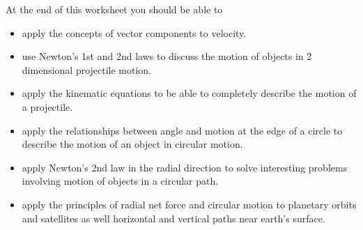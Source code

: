 At the end of this worksheet you should be able to  
\begin{itemize}
	\item apply the concepts of vector components to velocity.
	\item use Newton's 1st and 2nd laws to discuss the motion of objects in 2 dimensional projectile motion.
	\item apply the kinematic equations to be able to completely describe the motion of a projectile.
	\item apply the relationships between angle and motion at the edge of a circle to describe the motion of an object in circular motion.
	\item apply Newton's 2nd law in the radial direction to solve interesting problems involving motion of objects in a circular path.
	\item apply the principles of radial net force and circular motion to planetary orbits and satellites as well horizontal and vertical paths near earth's surface.
\end{itemize}


